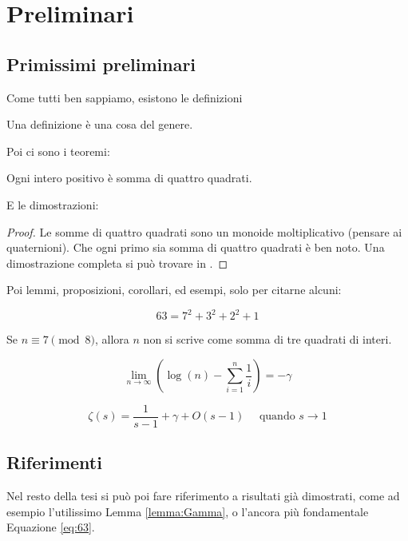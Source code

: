 \chapter{Preliminari}

\section{Primissimi preliminari}

Come tutti ben sappiamo, esistono le definizioni
\begin{definition}
Una definizione è una cosa del genere.
\end{definition}

Poi ci sono i teoremi:
\begin{theorem}
Ogni intero positivo è somma di quattro quadrati.
\end{theorem}

E le dimostrazioni:
\begin{proof}
Le somme di quattro quadrati sono un monoide moltiplicativo (pensare ai quaternioni). Che ogni primo sia somma di quattro quadrati è ben noto. Una dimostrazione completa si può trovare in \cite[Teorema 2.3]{ArticoloFondamentale}.
\end{proof}

Poi lemmi, proposizioni, corollari, ed esempi, solo per citarne alcuni:

\begin{example}
\begin{equation}\label{eq:63}
63=7^2+3^2+2^2+1
\end{equation}
\end{example}
\begin{proposition}
Se $n \equiv 7 \pmod 8$, allora $n$ non si scrive come somma di tre quadrati di interi.
\end{proposition}
\begin{lemma}\label{lemma:Gamma}
\[
\lim_{n \to \infty} \left( \log(n) - \sum_{i=1}^n \frac{1}{i} \right)= -\gamma
\]
\end{lemma}
\begin{corollary}
\[
\zeta(s) = \frac{1}{s-1} + \gamma + O(s-1) \quad \text{ quando } s \to 1
\]
\end{corollary}

\section{Riferimenti}
Nel resto della tesi si può poi fare riferimento a risultati già dimostrati, come ad esempio l'utilissimo Lemma \ref{lemma:Gamma}, o l'ancora più fondamentale Equazione \eqref{eq:63}.